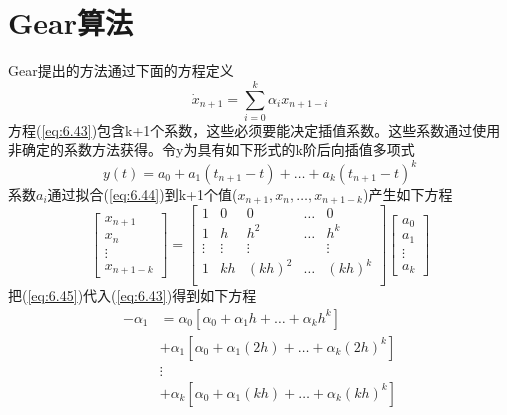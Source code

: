 \section{Gear算法}
Gear\cite{ref-66,ref-67}提出的方法通过下面的方程定义
\begin{equation}
    \dot{x}_{n+1} = \sum^k_{i=0}\alpha_ix_{n+1-i}
    \label{eq:6.43}
\end{equation}
方程(\ref{eq:6.43})包含k+1个系数，这些必须要能决定插值系数。这些系数通过使用非确定的系数方法获得。令y为具有如下形式的k阶后向插值多项式
\begin{equation}
    y(t) = a_0 + a_1(t_{n+1}-t) + \dots + a_k(t_{n+1}-t)^k
    \label{eq:6.44}
\end{equation}
系数$a_i$通过拟合(\ref{eq:6.44})到k+1个值($x_{n+1},x_n,\dots,x_{n+1-k}$)产生如下方程
\begin{equation}
    \begin{bmatrix}
x_{n+1} \\
x_n \\
\vdots \\
x_{n+1-k}
\end{bmatrix}=\begin{bmatrix}
1 &0  &0  &\dots  &0  \\
1 &h  &h^2  &\dots  &h^k  \\
\vdots &\vdots  &\vdots  &  &\vdots  \\
1 & kh & (kh)^2 &\dots  &(kh)^k  \\
\end{bmatrix}\begin{bmatrix}
a_0 \\
a_1 \\
\vdots \\
a_k
\end{bmatrix}
\label{eq:6.45}
\end{equation}
把(\ref{eq:6.45})代入(\ref{eq:6.43})得到如下方程
\begin{equation}
\begin{aligned}
    -\alpha_1 &= \alpha_0[\alpha_0 + \alpha_1h + \dots + \alpha_kh^k] \\
    &+ \alpha_1[\alpha_0 + \alpha_1(2h) + \dots + \alpha_k(2h)^k] \\
    &\vdots \\
    & +\alpha_k[\alpha_0 + \alpha_1(kh) + \dots + \alpha_k(kh)^k]
    \label{eq:6.46}
\end{aligned}
\end{equation}

